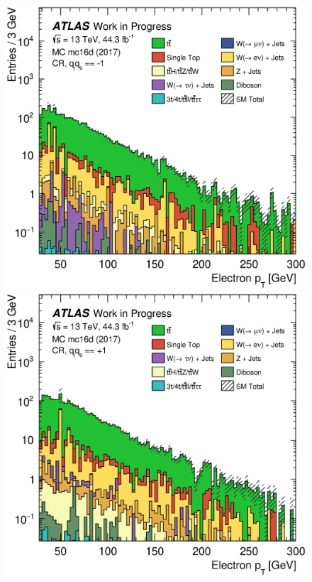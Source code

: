 \clearpage{}
\begin{figure}[th!]
    \centering
    \setlength{\individualPlotWidth}{0.47\fulllinewidth}
    \includegraphics[width=\individualPlotWidth]{Assets/Plots/qq-sign/qq==-1/h_stack_mc16d_el_pt.eps}
    \hspace{1em}
    \includegraphics[width=\individualPlotWidth]{Assets/Plots/qq-sign/qq==+1/h_stack_mc16d_el_pt.eps}


\end{figure}
